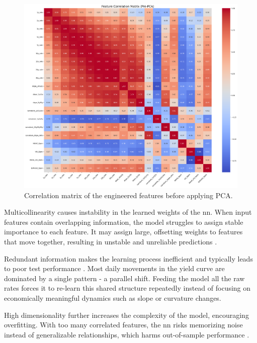 \begin{figure}[H]
	\centering
	\includegraphics[width=1\textwidth]{images/features/feature_correlation_matrixPre-PCA.png}
	\caption{Correlation matrix of the engineered features before applying PCA.}
	\label{fig:feature_correlation_prePCA}
\end{figure}

Multicollinearity causes instability in the learned weights of the \ac{nn}. When input features contain overlapping information, the model struggles to assign stable importance to each feature. It may assign large, offsetting weights to features that move together, resulting in unstable and unreliable predictions \parencite[p.~2]{chan2022multicollinearity}.

Redundant information makes the learning process inefficient and typically leads to poor test performance \parencite[p.~3]{sildir2020redudantfeatures}. Most daily movements in the yield curve are dominated by a single pattern - a parallel shift. Feeding the model all the raw rates forces it to re-learn this shared structure repeatedly instead of focusing on economically meaningful dynamics such as slope or curvature changes.

High dimensionality further increases the complexity of the model, encouraging overfitting. With too many correlated features, the \ac{nn} risks memorizing noise instead of generalizable relationships, which harms out-of-sample performance \parencite[p.~3]{sildir2020redudantfeatures}.

